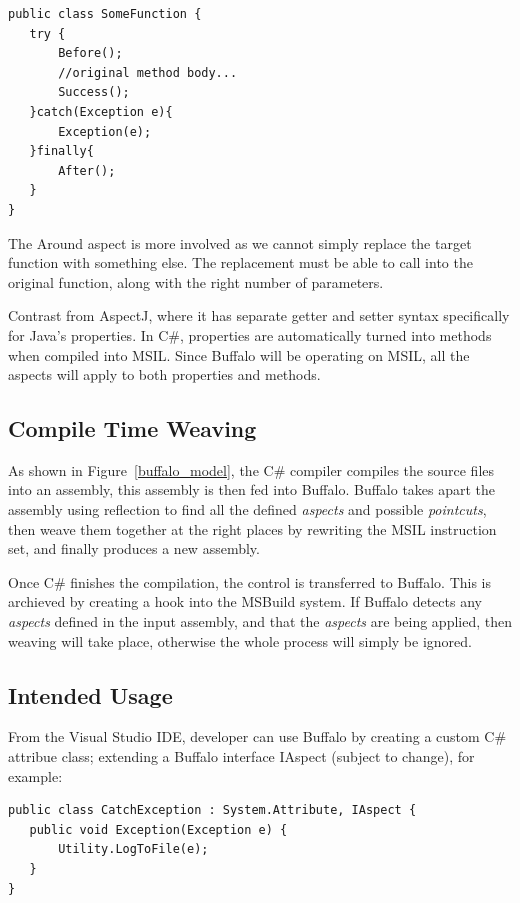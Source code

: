 \begin{lstlisting}[caption={Buffalo aspects}, label=boundaryaspect]
public class SomeFunction {
   try {
       Before();
       //original method body...
       Success();
   }catch(Exception e){
       Exception(e);
   }finally{
       After();
   }
}
\end{lstlisting}

The Around aspect is more involved as we cannot simply replace the target function with something else. The replacement must be able to call into the original function, along with the right number of parameters.

Contrast from AspectJ, where it has separate getter and setter syntax specifically for Java's properties. In C\#, properties are automatically turned into methods when compiled into MSIL. Since Buffalo will be operating on MSIL, all the aspects will apply to both properties and methods.

\subsection{Compile Time Weaving}
As shown in Figure~\ref{buffalo_model}, the C\# compiler compiles the source files into an assembly, this assembly is then fed into Buffalo. Buffalo takes apart the assembly using reflection to find all the defined {\em aspects} and possible {\em pointcuts}, then weave them together at the right places by rewriting the MSIL instruction set, and finally produces a new assembly.

Once C\# finishes the compilation, the control is transferred to Buffalo. This is archieved by creating a hook into the MSBuild system. If Buffalo detects any {\em aspects} defined in the input assembly, and that the {\em aspects} are being applied, then weaving will take place, otherwise the whole process will simply be ignored.

\subsection{Intended Usage}
From the Visual Studio IDE, developer can use Buffalo by creating a custom C\# attribue class; extending a Buffalo interface IAspect (subject to change), for example:

\begin{lstlisting}[caption={Buffalo aspect}, label=buffalocode]
public class CatchException : System.Attribute, IAspect {
   public void Exception(Exception e) {
       Utility.LogToFile(e);
   } 
}
\end{lstlisting}

